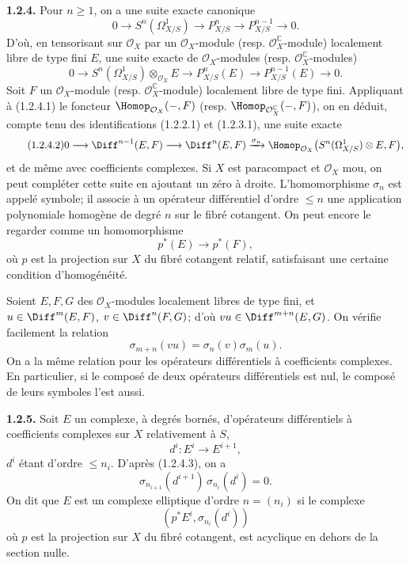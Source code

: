 \documentclass[11pt]{article}
\providecommand{\cO}{\mathcal O}
\begin{document}
\textbf{1.2.4.} Pour $n\ge1$, on a une suite exacte canonique
\[
  0\longrightarrow S^n(\Omega^1_{X/S})
  \longrightarrow P^n_{X/S}
  \longrightarrow P^{n-1}_{X/S}
  \longrightarrow 0.
\]
D'où, en tensorisant sur $\cO_X$ par un $\cO_X$-module (resp. $\cO_X^\mathbb C$-module) localement libre de type fini $E$, une suite exacte de $\cO_X$-modules (resp. $\cO_X^\mathbb C$-modules)
\begin{equation}\tag{1.2.4.1}
  0\longrightarrow S^n(\Omega^1_{X/S})\otimes_{\cO_X}E
  \longrightarrow P^n_{X/S}(E)
  \longrightarrow P^{n-1}_{X/S}(E)
  \longrightarrow 0.
\end{equation}
Soit $F$ un $\cO_X$-module (resp. $\cO_X^\mathbb C$-module) localement libre de type fini. Appliquant à (1.2.4.1) le foncteur $\Homop_{\cO_X}(-,F)$ (resp. $\Homop_{\cO_X^\mathbb C}(-,F)$), on en déduit, compte tenu des identifications (1.2.2.1) et (1.2.3.1), une suite exacte
\begin{equation}\tag{1.2.4.2}
  0\longrightarrow \Diff^{n-1}(E,F)
  \longrightarrow \Diff^n(E,F)
  \xrightarrow{\sigma_n}
  \Homop_{\cO_X}\bigl(S^n(\Omega^1_{X/S})\otimes E,F\bigr),
\end{equation}
et de même avec coefficients complexes. Si $X$ est paracompact et $\cO_X$ mou, on peut compléter cette suite en ajoutant un zéro à droite. L'homomorphisme $\sigma_n$ est appelé symbole; il associe à un opérateur différentiel d'ordre $\le n$ une application polynomiale homogène de degré $n$ sur le fibré cotangent. On peut encore le regarder comme un homomorphisme
\[
  p^*(E)\longrightarrow p^*(F),
\]
où $p$ est la projection sur $X$ du fibré cotangent relatif, satisfaisant une certaine condition d'homogénéité.

Soient $E,F,G$ des $\cO_X$-modules localement libres de type fini, et $u\in\Diff^m(E,F)$, $v\in\Diff^n(F,G)$; d'où $vu\in\Diff^{m+n}(E,G)$. On vérifie facilement la relation
\begin{equation}\tag{1.2.4.3}
  \sigma_{m+n}(vu)=\sigma_n(v)\sigma_m(u).
\end{equation}
On a la même relation pour les opérateurs différentiels à coefficients complexes. En particulier, si le composé de deux opérateurs différentiels est nul, le composé de leurs symboles l'est aussi.

\textbf{1.2.5.} Soit $E$ un complexe, à degrés bornés, d'opérateurs différentiels à coefficients complexes sur $X$ relativement à $S$,
\[
  d^i:E^i\longrightarrow E^{i+1},
\]
$d^i$ étant d'ordre $\le n_i$. D'après (1.2.4.3), on a
\[
  \sigma_{n_{i+1}}(d^{i+1})\,\sigma_{n_i}(d^i)=0.
\]
On dit que $E$ est un complexe elliptique d'ordre $n=(n_i)$ si le complexe
\[
  (p^*E^i,\sigma_{n_i}(d^i))
\]
où $p$ est la projection sur $X$ du fibré cotangent, est acyclique en dehors de la section nulle.
\end{document}
